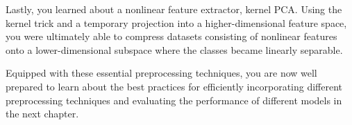 \documentclass[11pt]{article}
\begin{document}
Lastly, you learned about a nonlinear feature extractor, kernel PCA.
Using the kernel trick and a temporary projection into a
higher-dimensional feature space, you were ultimately able to compress
datasets consisting of nonlinear features onto a lower-dimensional
subspace where the classes became linearly separable.

Equipped with these essential preprocessing techniques, you are now well
prepared to learn about the best practices for efficiently incorporating
different preprocessing techniques and evaluating the performance of
different models in the next chapter.


    
    
    
    
\end{document}
